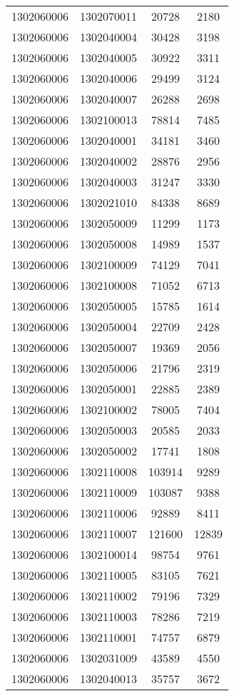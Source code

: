 \begin{longtable}{llcc}
1302060006 & 1302070011 & 20728 & 2180\\
1302060006 & 1302040004 & 30428 & 3198\\
1302060006 & 1302040005 & 30922 & 3311\\
1302060006 & 1302040006 & 29499 & 3124\\
1302060006 & 1302040007 & 26288 & 2698\\
1302060006 & 1302100013 & 78814 & 7485\\
1302060006 & 1302040001 & 34181 & 3460\\
1302060006 & 1302040002 & 28876 & 2956\\
1302060006 & 1302040003 & 31247 & 3330\\
1302060006 & 1302021010 & 84338 & 8689\\
1302060006 & 1302050009 & 11299 & 1173\\
1302060006 & 1302050008 & 14989 & 1537\\
1302060006 & 1302100009 & 74129 & 7041\\
1302060006 & 1302100008 & 71052 & 6713\\
1302060006 & 1302050005 & 15785 & 1614\\
1302060006 & 1302050004 & 22709 & 2428\\
1302060006 & 1302050007 & 19369 & 2056\\
1302060006 & 1302050006 & 21796 & 2319\\
1302060006 & 1302050001 & 22885 & 2389\\
1302060006 & 1302100002 & 78005 & 7404\\
1302060006 & 1302050003 & 20585 & 2033\\
1302060006 & 1302050002 & 17741 & 1808\\
1302060006 & 1302110008 & 103914 & 9289\\
1302060006 & 1302110009 & 103087 & 9388\\
1302060006 & 1302110006 & 92889 & 8411\\
1302060006 & 1302110007 & 121600 & 12839\\
1302060006 & 1302100014 & 98754 & 9761\\
1302060006 & 1302110005 & 83105 & 7621\\
1302060006 & 1302110002 & 79196 & 7329\\
1302060006 & 1302110003 & 78286 & 7219\\
1302060006 & 1302110001 & 74757 & 6879\\
1302060006 & 1302031009 & 43589 & 4550\\
1302060006 & 1302040013 & 35757 & 3672\\

\end{longtable}
